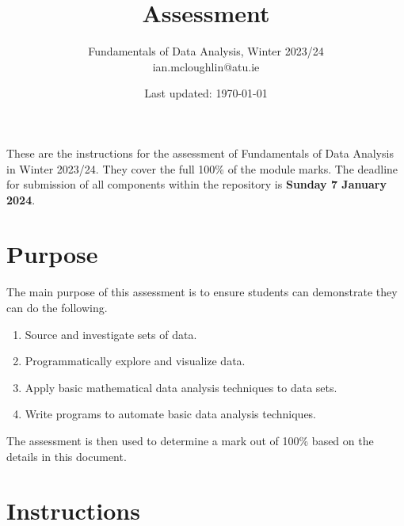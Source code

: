 \documentclass{iansnotes}
\title{Assessment}
\author{Fundamentals of Data Analysis, Winter 2023/24\\ian.mcloughlin@atu.ie}
\date{Last updated: \today}
\begin{document}
 
\maketitle

These are the instructions for the assessment of Fundamentals of Data Analysis in Winter 2023/24.
They cover the full 100\% of the module marks.
The deadline for submission of all components within the repository is \textbf{Sunday 7 January 2024}.

\section{Purpose}
The main purpose of this assessment is to ensure students can demonstrate they can do the following.
\begin{enumerate}
  \item Source and investigate sets of data.
  \item Programmatically explore and visualize data.
  \item Apply basic mathematical data analysis techniques to data sets.
  \item Write programs to automate basic data analysis techniques.
\end{enumerate}
The assessment is then used to determine a mark out of 100\% based on the details in this document.


\section{Instructions}
\end{document}
